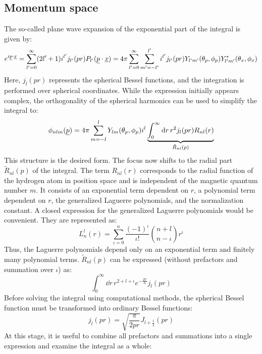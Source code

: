 \subsection*{Momentum space}
The so-called plane wave expansion \cite{Jackson:1998nia} of the exponential part of the integral is given by:
\begin{equation*}
    e^{i\underline{p}\cdot\underline{x}} = \sum_{l'=0}^\infty (2l'+1)i^{l'} j_{l'}(pr) P_{l'}(\underline{p}\cdot\underline{x}) = 4\pi\sum_{l'=0}^\infty \sum_{m'=-l'}^{l'} i^{l'} j_{l'}(pr) Y_{l'm'}(\theta_p, \phi_p) Y_{l'm'}^*(\theta_x, \phi_x)
\end{equation*}
Here, $j_l(pr)$ represents the spherical Bessel functions, and the integration is performed over spherical coordinates. 
While the expression initially appears complex, the orthogonality of the spherical harmonics can be used to simplify the integral to:
\begin{equation*}
    \phi_{nlm}(\underline{p}) = 4\pi \sum_{m=-l}^{l}Y_{lm}(\theta_p,\phi_p)i^l\underbrace{\int_{0}^{\infty}\mathrm{d} r\,r^2j_l(pr)R_{nl}(r)}_{\tilde{R}_{nl}(p)}
\end{equation*}
This structure is the desired form. The focus now shifts to the radial part $\tilde{R}_{nl}(p)$ of the integral.
The term $R_{nl}(r)$ corresponds to the radial function of the hydrogen atom in position space and is independent of the magnetic quantum number $m$.
It consists of an exponential term dependent on $r$, a polynomial term dependent on $r$, the generalized Laguerre polynomials, and the normalization constant.
A closed expression for the generalized Laguerre polynomials would be convenient. They are represented as:
\begin{equation*}
    L_n^l(r) = \sum_{\iota=0}^{n} \frac{(-1)^{\iota}}{\iota!}\binom{n+l}{n-\iota}r^{\iota}
\end{equation*}
Thus, the Laguerre polynomials depend only on an exponential term and finitely many polynomial terms.
$\tilde{R}_{nl}(p)$ can be expressed (without prefactors and summation over $\iota$) as:
\begin{equation*}
    \int_{0}^{\infty}\dd r\,r^{2+l+\iota} e^{-\frac{Zr}{n}} j_l(pr)
\end{equation*}
Before solving the integral using computational methods, the spherical Bessel function must be transformed into ordinary Bessel functions:
\begin{equation*}
    j_l(pr) = \sqrt{\frac{\pi}{2pr}}J_{l+\frac{1}{2}}(pr)
\end{equation*}
At this stage, it is useful to combine all prefactors and summations into a single expression and examine the integral as a whole:
